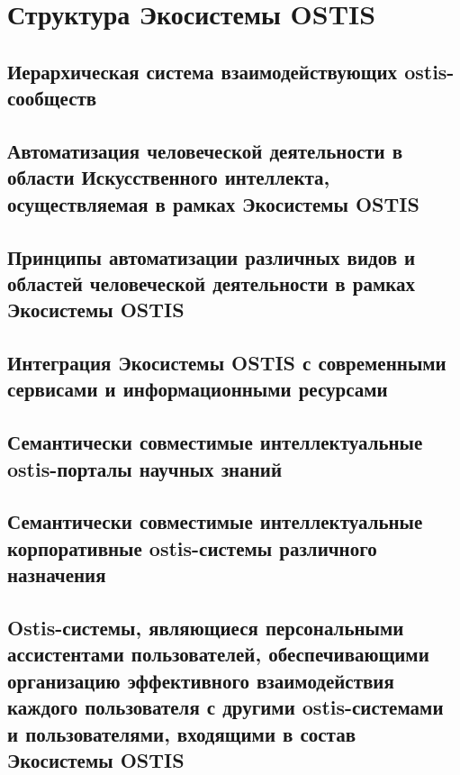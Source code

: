 \chapter{Структура Экосистемы OSTIS}
\label{chapter_ecosystem}


\section{Иерархическая система взаимодействующих ostis-сообществ}
\section{Автоматизация человеческой деятельности в области Искусственного интеллекта, осуществляемая в рамках Экосистемы OSTIS}
\section{Принципы автоматизации различных видов и областей человеческой деятельности в рамках Экосистемы OSTIS}
\section{Интеграция Экосистемы OSTIS с современными сервисами и информационными ресурсами}
\section{Семантически совместимые интеллектуальные ostis-порталы научных знаний}
\section{Семантически совместимые интеллектуальные корпоративные ostis-системы различного назначения}
\section{Ostis-системы, являющиеся персональными ассистентами пользователей, обеспечивающими организацию эффективного взаимодействия каждого пользователя с другими ostis-системами и пользователями, входящими в состав Экосистемы OSTIS}

%